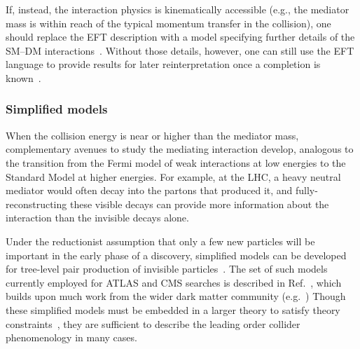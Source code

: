 
If, instead, the interaction physics is kinematically accessible (e.g., the mediator mass is within reach of the typical momentum transfer in the collision), one should replace the EFT description with a model specifying further details of the SM--DM interactions~\cite{Fox:2011pm}.
Without those details, however, one can still use the EFT language to provide results for later reinterpretation once a completion is known~\cite{Racco:2015dxa,Busoni:2013lha}. 


\subsubsection{Simplified models}
\label{sub:simplifiedModels}

When the collision energy is near or higher than the mediator mass, complementary avenues to study the mediating interaction develop, analogous to the transition from the Fermi model of weak interactions at low energies to the Standard Model at higher energies.
For example, at the LHC, a heavy neutral \Zprime mediator would often decay into the partons that produced it, and fully-reconstructing these visible decays can provide more information about the interaction than the invisible decays alone. 

Under the reductionist assumption that only a few new particles will be important in the early phase of a discovery, simplified models can be developed for tree-level pair production of invisible particles~\cite{Alwall:2008ag, Agrawal:2010fh, Alves:2011wf, Choudhury:2015lha}. The set of such models currently employed for ATLAS and CMS searches is described in Ref.~\cite{Abercrombie:2015wmb}, which builds upon much work from the wider dark matter community (e.g.~\cite{Fox:2011pm,Yavin:14092893,Malik:2014ggr,Abdallah:2015ter}) 
Though these simplified models must be embedded in a larger theory to satisfy theory constraints~\cite{Kahlhoefer:2015bea}, they are sufficient to describe the leading order collider phenomenology in many cases.

